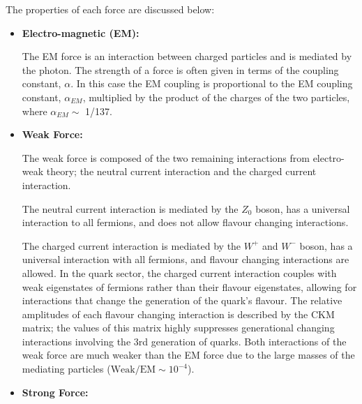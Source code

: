 \noindent
The properties of each force are discussed below:
\begin{itemize}[leftmargin=*]
\item\textbf{Electro-magnetic (EM):}

  The EM force is an interaction between charged particles and is mediated by the photon.
  The strength of a force is often given in terms of the coupling constant, $\alpha$.
  In this case the EM coupling is proportional to the EM coupling constant, $\alpha_{EM}$,
  multiplied by the product of the charges of the two particles, where $\alpha_{EM} \sim$ 1/137.\\ %

\item\textbf{Weak Force:}
  
  The weak force is composed of the two remaining interactions from electro-weak theory;
  the neutral current interaction and the charged current interaction.
  
  The neutral current interaction is mediated by the $Z_0$ boson, has a universal interaction to all fermions,
  and does not allow flavour changing interactions.

  The charged current interaction is mediated by the $W^+$ and $W^-$ boson, has a universal interaction with all fermions,
  and flavour changing interactions are allowed.
  In the quark sector, the charged current interaction
  couples with weak eigenstates of fermions rather than their flavour eigenstates,
  allowing for interactions that change the generation of the quark's flavour.
  The relative amplitudes of each flavour changing interaction is described by the CKM matrix;
  the values of this matrix highly suppresses generational changing interactions involving the 3rd generation of quarks.
  Both interactions of the weak force are much weaker than the EM force
  due to the large masses of the mediating particles
  ($\text{Weak}/\text{EM} \sim 10^{-4}$).\\ %
  
\item\textbf{Strong Force:}


\end{itemize}
